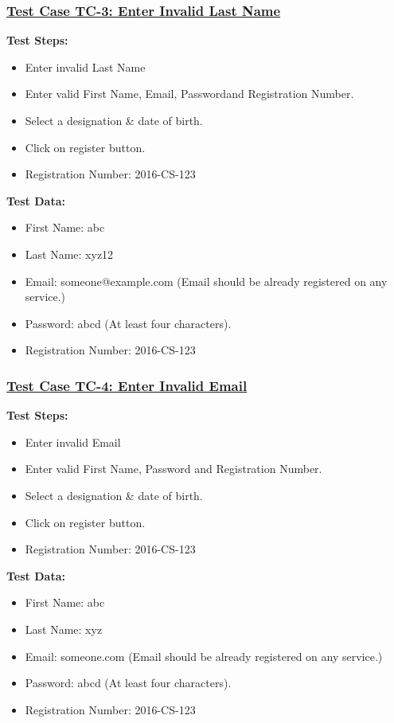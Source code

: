 \subsubsection{\underline{Test Case TC-3: Enter Invalid Last Name}}
\textbf{Test Steps:}
\begin{itemize}

\item Enter invalid Last Name
\item Enter valid First Name, Email, Passwordand Registration Number.
\item Select a designation \& date of birth.
\item Click on register button.
\item Registration Number: 2016-CS-123

\end{itemize}

\textbf{Test Data:}
\begin{itemize}

\item First Name: abc
\item Last Name: xyz12
\item Email: someone@example.com (Email should be already registered on any service.)
\item Password: abcd (At least four characters).
\item Registration Number: 2016-CS-123

\end{itemize}

\subsubsection{\underline{Test Case TC-4: Enter Invalid Email}}
\textbf{Test Steps:}
\begin{itemize}

\item Enter invalid Email
\item Enter valid First Name, Password and Registration Number.
\item Select a designation \& date of birth.
\item Click on register button.
\item Registration Number: 2016-CS-123

\end{itemize}

\textbf{Test Data:}
\begin{itemize}

\item First Name: abc
\item Last Name: xyz
\item Email: someone.com (Email should be already registered on any service.)
\item Password: abcd (At least four characters).
\item Registration Number: 2016-CS-123

\end{itemize}


